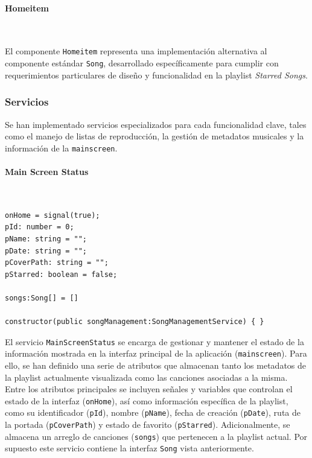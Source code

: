 \documentclass[11pt, a4paper]{article}
\begin{document}
                \paragraph{Homeitem}
                ‎

                El componente \texttt{Homeitem} representa una implementación alternativa al componente estándar \texttt{Song}, desarrollado específicamente para cumplir con requerimientos particulares de diseño y funcionalidad en la playlist \textit{Starred Songs}.

            \subsubsection{Servicios}

            Se han implementado servicios especializados para cada funcionalidad clave, tales como el manejo de listas de reproducción, la gestión de metadatos musicales y la información de la \texttt{mainscreen}.

                \paragraph{Main Screen Status}
                ‎

                \begin{lstlisting}[caption={Atributos Main Screen Status}]
onHome = signal(true);
pId: number = 0;
pName: string = "";
pDate: string = "";
pCoverPath: string = "";
pStarred: boolean = false;

songs:Song[] = []

constructor(public songManagement:SongManagementService) { }
                \end{lstlisting}

                El servicio \texttt{MainScreenStatus} se encarga de gestionar y mantener el estado de la información mostrada en la interfaz principal de la aplicación (\texttt{mainscreen}). Para ello, se han definido una serie de atributos que almacenan tanto los metadatos de la playlist actualmente visualizada como las canciones asociadas a la misma. \\

                Entre los atributos principales se incluyen señales y variables que controlan el estado de la interfaz (\texttt{onHome}), así como información específica de la playlist, como su identificador (\texttt{pId}), nombre (\texttt{pName}), fecha de creación (\texttt{pDate}), ruta de la portada (\texttt{pCoverPath}) y estado de favorito (\texttt{pStarred}). Adicionalmente, se almacena un arreglo de canciones (\texttt{songs}) que pertenecen a la playlist actual. Por supuesto este servicio contiene la interfaz \texttt{Song} vista anteriormente. \\
\end{document}
